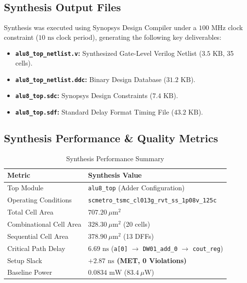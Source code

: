 \documentclass[12pt,a4paper]{article}
\begin{document}
\subsection{Synthesis Output Files}
Synthesis was executed using Synopsys Design Compiler under a $100\text{ MHz}$ clock constraint ($10\text{ ns}$ clock period), generating the following key deliverables:
\begin{itemize}
  \item \textbf{\texttt{alu8\_top\_netlist.v}:} Synthesized Gate-Level Verilog Netlist ($3.5\text{ KB}$, 35 cells).
  \item \textbf{\texttt{alu8\_top\_netlist.ddc}:} Binary Design Database ($31.2\text{ KB}$).
  \item \textbf{\texttt{alu8\_top.sdc}:} Synopsys Design Constraints ($7.4\text{ KB}$).
  \item \textbf{\texttt{alu8\_top.sdf}:} Standard Delay Format Timing File ($43.2\text{ KB}$).
\end{itemize}

\subsection{Synthesis Performance \& Quality Metrics}
\begin{table}[H]
\centering
\begin{tabular}{ll}
\toprule
\textbf{Metric} & \textbf{Synthesis Value} \\
\midrule
Top Module & \texttt{alu8\_top} (Adder Configuration) \\
Operating Conditions & \texttt{scmetro\_tsmc\_cl013g\_rvt\_ss\_1p08v\_125c} \\
Total Cell Area & \textbf{$707.20\ \mu\text{m}^2$} \\
Combinational Cell Area & $328.30\ \mu\text{m}^2$ (20 cells) \\
Sequential Cell Area & $378.90\ \mu\text{m}^2$ (13 DFFs) \\
Critical Path Delay & $6.69\text{ ns}$ (\texttt{a[0]} $\to$ \texttt{DW01\_add\_0} $\to$ \texttt{cout\_reg}) \\
Setup Slack & \textbf{$+2.87\text{ ns}$ (MET, 0 Violations)} \\
Baseline Power & $0.0834\text{ mW}$ ($83.4\ \mu\text{W}$) \\
\bottomrule
\end{tabular}
\caption{Synthesis Performance Summary}
\end{table}

\end{document}
